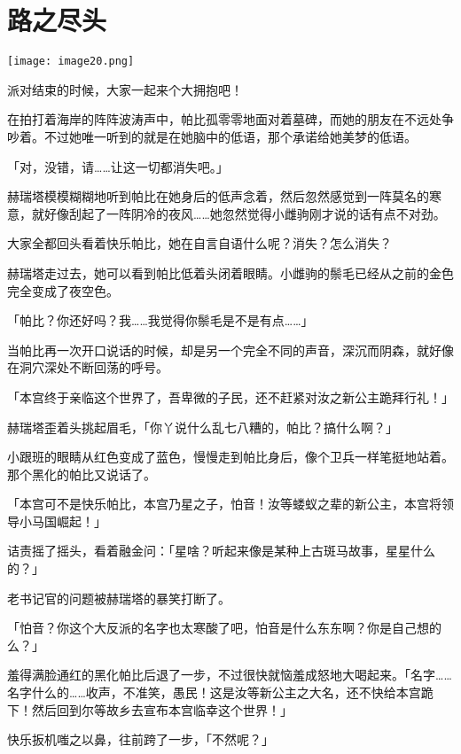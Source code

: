 \chapter{路之尽头}

\texttt{[image: image20.png]}

\begin{intro}
    派对结束的时候，大家一起来个大拥抱吧！
\end{intro}


在拍打着海岸的阵阵波涛声中，帕比孤零零地面对着墓碑，而她的朋友在不远处争吵着。不过她唯一听到的就是在她脑中的低语，那个承诺给她美梦的低语。

「对，没错，请……让这一切都消失吧。」

赫瑞塔模模糊糊地听到帕比在她身后的低声念着，然后忽然感觉到一阵莫名的寒意，就好像刮起了一阵阴冷的夜风……她忽然觉得小雌驹刚才说的话有点不对劲。

大家全都回头看着快乐帕比，她在自言自语什么呢？消失？怎么消失？

赫瑞塔走过去，她可以看到帕比低着头闭着眼睛。小雌驹的鬃毛已经从之前的金色完全变成了夜空色。

「帕比？你还好吗？我……我觉得你鬃毛是不是有点……」

当帕比再一次开口说话的时候，却是另一个完全不同的声音，深沉而阴森，就好像在洞穴深处不断回荡的呼号。

「本宫终于亲临这个世界了，吾卑微的子民，还不赶紧对汝之新公主跪拜行礼！」

赫瑞塔歪着头挑起眉毛，「你丫说什么乱七八糟的，帕比？搞什么啊？」

小跟班的眼睛从红色变成了蓝色，慢慢走到帕比身后，像个卫兵一样笔挺地站着。那个黑化的帕比又说话了。

「本宫可不是快乐帕比，本宫乃星之子，怕音！汝等蝼蚁之辈的新公主，本宫将领导小马国崛起！」

诘责摇了摇头，看着融金问：「星啥？听起来像是某种上古斑马故事，星星什么的？」

老书记官的问题被赫瑞塔的暴笑打断了。

「怕音？你这个大反派的名字也太寒酸了吧，怕音是什么东东啊？你是自己想的么？」

羞得满脸通红的黑化帕比后退了一步，不过很快就恼羞成怒地大喝起来。「名字……名字什么的……收声，不准笑，愚民！这是汝等新公主之大名，还不快给本宫跪下！然后回到尔等故乡去宣布本宫临幸这个世界！」

快乐扳机嗤之以鼻，往前跨了一步，「不然呢？」

